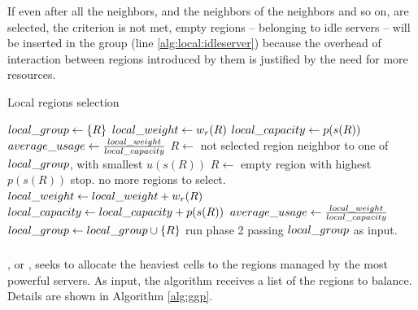 If even after all the neighbors, and the neighbors of the neighbors and so on, are selected, the criterion is not met, empty regions -- belonging to idle servers -- will be inserted in the group (line \ref{alg:local:idleserver}) because the overhead of interaction between regions introduced by them is justified by the need for more resources.

\begin{algorithm}
\caption{Local regions selection}
\label{alg:local}
\begin{algorithmic}[1]
	 \STATE $local\_group \leftarrow \{R\}$
	 \STATE $local\_weight \leftarrow w_r(R)$
	 \STATE $local\_capacity \leftarrow p(s(R))$
	 \STATE $average\_usage \leftarrow \frac{local\_weight}{local\_capacity}$
	  \label{alg:local:condition}
	 			 \STATE $R \leftarrow$ not selected region neighbor to one of $local\_group$, with smallest $u(s(R))$
	 		 \label{alg:local:idleserver}
	 			 \STATE $R \leftarrow$ empty region with highest $p(s(R))$
	 		\ELSE
	 			 \STATE stop. no more regions to select.
	 		\ENDIF
	 		\STATE $local\_weight \leftarrow local\_weight + w_r(R)$
	 		\STATE $local\_capacity \leftarrow local\_capacity + p(s(R))$
	 		\STATE $average\_usage \leftarrow \frac{local\_weight}{local\_capacity}$
	 		\STATE $local\_group \leftarrow local\_group \cup \{R\}$
	 \ENDWHILE
	 \STATE run phase 2 passing $local\_group$ as input.
\end{algorithmic}
\end{algorithm}

\subsubsection{\ggp} %
\label{sec:alg:ggp}
	
\textbf{\ggp}, or \ggpmeaning, seeks to allocate the heaviest cells to the regions managed by the most powerful servers. As input, the algorithm receives a list of the regions to balance. Details are shown in Algorithm \ref{alg:ggp}.


